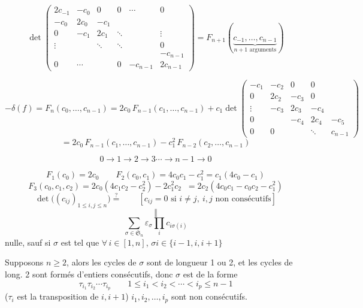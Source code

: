\documentclass[11pt,a4paper]{article}
\begin{document}
\[
\det \begin{pmatrix}
2c_{-1} & -c_0 & 0 & 0 & \cdots & 0 \\
-c_0 & 2c_0 & -c_1 & & & \\
0 & -c_1 & 2c_1 & \ddots & & \vdots \\
\vdots & & \ddots & \ddots & & 0 \\
 & & & & & -c_{n-1} \\
0 & \cdots & & 0 & -c_{n-1} & 2c_{n-1}
\end{pmatrix}
= F_{n+1}(\underbrace{c_{-1}, \ldots, c_{n-1}}_{n+1 \text{ arguments}})
\]

\[
-\delta(f) = F_n(c_0, \ldots, c_{n-1}) = 2c_0\, F_{n-1}(c_1, \ldots, c_{n-1})
+ c_1 \det \begin{pmatrix}
-c_1 & -c_2 & 0 & 0 & \\
0 & 2c_2 & -c_3 & 0 & \\
\vdots & -c_3 & 2c_3 & -c_4 & \\
0 & & -c_4 & 2c_4 & -c_5 \\
0 & 0 & & \ddots & c_{n-1}
\end{pmatrix}
\]
\[
= 2c_0\, F_{n-1}(c_1, \ldots, c_{n-1}) - c_1^2\, F_{n-2}(c_2, \ldots, c_{n-1})
\]

\[
0 \to 1 \to 2 \to 3 \cdots \to n-1 \to 0
\]
 \ill{} \ill{}

\[
F_1(c_0) = 2c_0 \qquad
F_2(c_0, c_1) = 4c_0c_1 - c_1^2 = c_1(4c_0 - c_1)
\]
\[
F_3(c_0, c_1, c_2) = 2c_0(4c_1c_2 - c_2^2) - 2c_1^2 c_2
\;\;
= 2c_2(4c_0c_1 - c_0c_2 - c_1^2)
\]
\[
\det\bigl((c_{ij})_{1 \leqslant i, j \leqslant n}\bigr) \overset{?}{=}
\qquad [c_{ij} = 0 \text{ si } i \neq j,\ i, j \text{ non consécutifs}]
\]
\[
\Vert
\]
\[
\sum_{\sigma \in \mathfrak{S}_n} \varepsilon_\sigma \prod_i c_{i\sigma(i)}
\]
nulle, sauf si $\sigma$ est tel que $\forall\, i \in [1, n]$,
$\sigma i \in \lbrace i-1, i, i+1 \rbrace$

Supposons $n \geqslant 2$, alors les cycles de $\sigma$ sont de longueur 1 ou
2, et les cycles de long. 2 sont formés d'entiers consécutifs, donc $\sigma$
est de la forme
\[
\tau_{i_1} \tau_{i_2} \cdots \tau_{i_p} \qquad
1 \leqslant i_1 < i_2 < \cdots < i_p \leqslant n-1
\]
($\tau_i$ est la transposition de $i, i+1$)  $i_1, i_2, \ldots,
i_p$ sont \ill{} non consécutifs.
\end{document}
